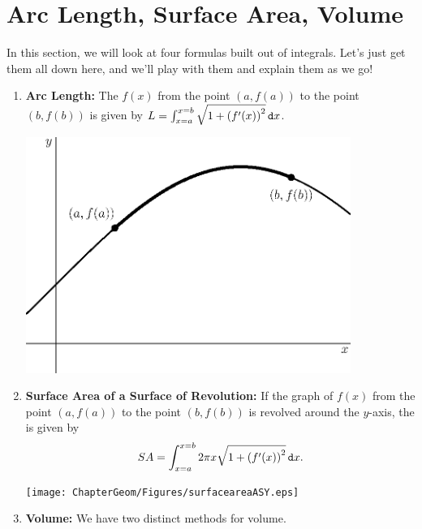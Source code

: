 \section{Arc Length, Surface Area, Volume}
In this section, we will look at four formulas built out of integrals.  Let's just get them all down here, and we'll play with them and explain them as we go!
\begin{enumerate}
\item {\bf Arc Length:} The  $f(x)$ from the point $\left(a,f(a)\right)$ to the point $\left(b,f(b)\right)$ is given by $ L= \int_{x=a}^{x=b} \sqrt{1+\left( f'(x)\right)^2 } \mathop{}\!\mathtt{d} x $.
	\begin{center}
        \includegraphics[width=300pt]{ChapterGeom/Figures/arclength.eps}
	\end{center}
\item {\bf Surface Area of a Surface of Revolution:} If the graph of $f(x)$ from the point $\left(a,f(a)\right)$ to the point $\left(b,f(b)\right)$ is revolved around the $y$-axis, the  is given by $$ SA= \int_{x=a}^{x=b} 2 \pi x\sqrt{1+\left( f'(x)\right)^2 } \mathop{}\!\mathtt{d} x .$$ 
	\begin{center}
        \texttt{[image: ChapterGeom/Figures/surfaceareaASY.eps]}
	\end{center}
    
\item {\bf Volume:} We have two distinct methods for volume.


\end{enumerate}
